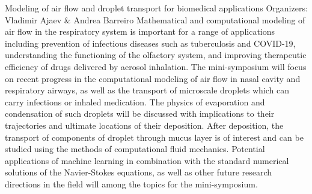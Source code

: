 \label{mini28}

\miniabs
{Modeling of air flow and droplet transport for biomedical applications}
{Organizers: Vladimir Ajaev \& Andrea Barreiro}
{Mathematical and computational modeling of air flow in the respiratory system is important for a range of applications including prevention of infectious diseases such as tuberculosis and COVID-19, understanding the functioning of the olfactory system, and improving therapeutic efficiency of drugs delivered by aerosol inhalation. The mini-symposium will focus on recent progress in the computational modeling of air flow in nasal cavity and respiratory airways, as well as the transport of microscale droplets which can carry infections or inhaled medication.    The physics of evaporation and condensation of such droplets will be discussed with implications to their trajectories and ultimate locations of their deposition. After deposition, the transport of components of droplet through mucus layer is of interest and can be studied using the methods of computational fluid mechanics. Potential applications of machine learning in combination with the standard numerical solutions of the Navier-Stokes equations, as well as other future research directions in the field will among the topics for the mini-symposium.}


